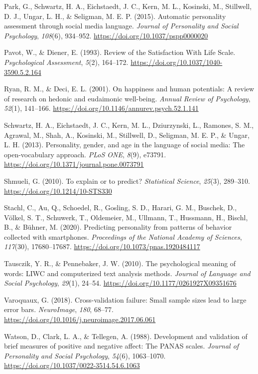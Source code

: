\documentclass[11pt,letterpaper]{article}
\newcommand{\APAref}{\par\noindent\hangindent=0.5in\hangafter=1\relax}
\begin{document}
\APAref Park, G., Schwartz, H. A., Eichstaedt, J. C., Kern, M. L., Kosinski, M., Stillwell, D. J., Ungar, L. H., \& Seligman, M. E. P. (2015). Automatic personality assessment through social media language. \emph{Journal of Personality and Social Psychology}, \emph{108}(6), 934--952. \url{https://doi.org/10.1037/pspp0000020}

\APAref Pavot, W., \& Diener, E. (1993). Review of the Satisfaction With Life Scale. \emph{Psychological Assessment}, \emph{5}(2), 164--172. \url{https://doi.org/10.1037/1040-3590.5.2.164}

\APAref Ryan, R. M., \& Deci, E. L. (2001). On happiness and human potentials: A review of research on hedonic and eudaimonic well-being. \emph{Annual Review of Psychology}, \emph{52}(1), 141--166. \url{https://doi.org/10.1146/annurev.psych.52.1.141}

\APAref Schwartz, H. A., Eichstaedt, J. C., Kern, M. L., Dziurzynski, L., Ramones, S. M., Agrawal, M., Shah, A., Kosinski, M., Stillwell, D., Seligman, M. E. P., \& Ungar, L. H. (2013). Personality, gender, and age in the language of social media: The open-vocabulary approach. \emph{PLoS ONE}, \emph{8}(9), e73791. \url{https://doi.org/10.1371/journal.pone.0073791}

\APAref Shmueli, G. (2010). To explain or to predict? \emph{Statistical Science}, \emph{25}(3), 289--310. \url{https://doi.org/10.1214/10-STS330}

\APAref Stachl, C., Au, Q., Schoedel, R., Gosling, S. D., Harari, G. M., Buschek, D., Völkel, S. T., Schuwerk, T., Oldemeier, M., Ullmann, T., Hussmann, H., Bischl, B., \& Bühner, M. (2020). Predicting personality from patterns of behavior collected with smartphones. \emph{Proceedings of the National Academy of Sciences}, \emph{117}(30), 17680--17687. \url{https://doi.org/10.1073/pnas.1920484117}

\APAref Tausczik, Y. R., \& Pennebaker, J. W. (2010). The psychological meaning of words: LIWC and computerized text analysis methods. \emph{Journal of Language and Social Psychology}, \emph{29}(1), 24--54. \url{https://doi.org/10.1177/0261927X09351676}

\APAref Varoquaux, G. (2018). Cross-validation failure: Small sample sizes lead to large error bars. \emph{NeuroImage}, \emph{180}, 68--77. \url{https://doi.org/10.1016/j.neuroimage.2017.06.061}

\APAref Watson, D., Clark, L. A., \& Tellegen, A. (1988). Development and validation of brief measures of positive and negative affect: The PANAS scales. \emph{Journal of Personality and Social Psychology}, \emph{54}(6), 1063--1070. \url{https://doi.org/10.1037/0022-3514.54.6.1063}
\end{document}
